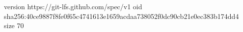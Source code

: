 version https://git-lfs.github.com/spec/v1
oid sha256:40ce9887f8fe0f65c4741613e1659acdaa738052f0dc90cb21e0ec383b174dd4
size 70
